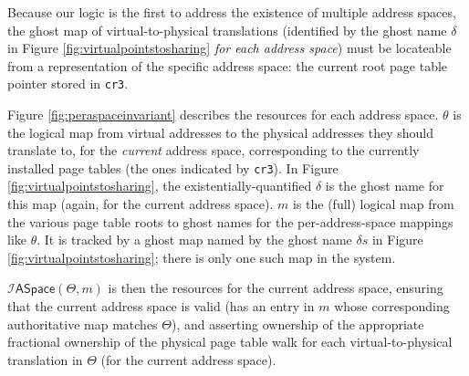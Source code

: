 Because our logic is the first to address the existence of multiple address spaces,
the ghost map of virtual-to-physical translations (identified by the ghost name $\delta$ in Figure \ref{fig:virtualpointstosharing}
 \emph{for each address space}) must be locateable from a representation of the specific address space:
the current root page table pointer stored in \lstinline|cr3|.

Figure \ref{fig:peraspaceinvariant} describes the resources for each address space.
$\theta$ is the logical map from virtual addresses to the physical addresses they should translate to, 
for the \emph{current} address space, corresponding to the currently installed page tables (the ones
indicated by \lstinline|cr3|). In Figure \ref{fig:virtualpointstosharing}, the existentially-quantified $\delta$
is the ghost name for this map (again, for the current address space).
$m$ is the (full) logical map from the various page table roots to ghost names for the 
per-address-space mappings like $\theta$.
It is tracked by a ghost map named by the ghost name $\delta{}s$ in
Figure \ref{fig:virtualpointstosharing}; there is only one such map in the system.


$\mathcal{I}\textsf{ASpace}(\Theta,m)$ is then the resources for the current address space,
ensuring that the current address space is valid (has an entry in $m$ whose corresponding
authoritative map matches $\Theta$), and asserting ownership of the appropriate fractional ownership
of the physical page table walk for each virtual-to-physical translation in $\Theta$ (for the current address space).



